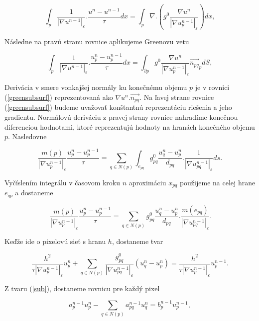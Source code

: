 \documentclass[a4paper,11pt,oneside]{article}%
\def\epsilon{\varepsilon}
\begin{document}
\begin{equation}
\int_{p}\frac{1}{|\nabla u^{n-1}|_{\epsilon}}.\frac{u^n-u^{n-1}}{\tau}dx = \int_{p}\nabla.(g^0\frac{\nabla u^n}{|\nabla u_p^{n-1}|_{\epsilon}})dx,
\end{equation}

Následne na pravú stranu rovnice aplikujeme Greenovu vetu

\begin{equation} \label{greensubsurf}
\int_{p}\frac{1}{|\nabla u^{n-1}|_{\epsilon}}.\frac{u_p^n-u_p^{n-1}}{\tau}dx = \int_{\partial p} g^0\frac{\nabla u^n}{|\nabla u_p^{n-1}|_{\epsilon}}\vec{n_{pq}}_pdS,
\end{equation}

Derivácia v smere vonkajšej normály ku konečnému objemu $p$ je v rovnici (\ref{greensubsurf}) reprezentovaná ako $\nabla u^n.\vec{n_{pq}}$. Na ľavej strane rovnice (\ref{greensubsurf}) budeme uvažovať konštantnú reprezentáciu riešenia a jeho gradientu. Normálovú deriváciu z pravej strany rovnice nahradíme konečnou diferenciou hodnotami, ktoré reprezentujú hodnoty na hranách konečného objemu $p$. Nasledovne

\begin{equation}
\frac{m(p)}{|\nabla u_p^{n-1}|_{\epsilon}}\frac{u_p^n-u_p^{n-1}}{\tau} = \sum_{q \in N(p)}\int_{e_{pq}}g_{pq}^0\frac{u_q^n - u_p^n}{d_{pq}}.\frac{1}{|\nabla u_{pq}^{n-1}|_{\epsilon}}ds.
\end{equation}

Vyčíslením integrálu v časovom kroku $n$ aproximáciu $x_{pq}$ použijeme na celej hrane $e_{qp}$ a dostaneme

\begin{equation} \
\frac{m(p)}{|\nabla u_p^{n-1}|_{\epsilon}}\frac{u_p^n-u_p^{n-1}}{\tau} = \sum_{q \in N(p)}g_{pq}^0\frac{u_q^n - u_p^n}{d_{pq}}.\frac{m(e_{pq})}{|\nabla u_{pq}^{n-1}|_{\epsilon}}.
\end{equation}

Keďže ide o pixelovú sieť s hranu $h$, dostaneme tvar

\begin{equation} \label{sub}
\frac{h^2}{\tau|\nabla u_p^{n-1}|_{\epsilon}}u_p^n + \sum_{q \in N(p)}\frac{g_{pq}^0}{|\nabla u_{pq}^{n-1}|_{\epsilon}}(u_q^n - u_p^n) = \frac{h^2}{\tau|\nabla u_p^{n-1}|_{\epsilon}}u_p^{n - 1}.
\end{equation}

Z tvaru (\ref{sub}), dostaneme rovnicu pre každý pixel

\begin{equation}
a_p^{n - 1}u_p^n - \sum_{q \in N(p)} a_{pq}^{n - 1}u_q^n =b_p^{n-1}u_p^{n-1},
\end{equation}
\end{document}
